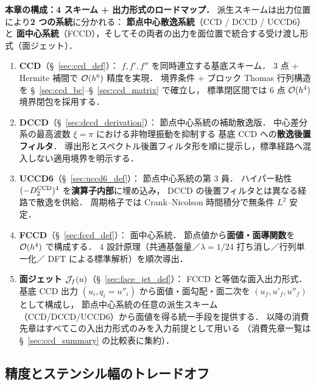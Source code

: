 \medskip
\noindent\textbf{本章の構成：4 スキーム + 出力形式のロードマップ．}
派生スキームは出力位置により\textbf{2 つの系統}に分かれる：
\textbf{節点中心散逸系統}（CCD / DCCD / UCCD6）と
\textbf{面中心系統}（FCCD），そしてその両者の出力を面位置で統合する受け渡し形式（面ジェット）．
\begin{enumerate}[leftmargin=*, label=(\arabic*), itemsep=2pt, topsep=2pt]
  \item \textbf{CCD}（§~\ref{sec:ccd_def}）：
        $f, f', f''$ を同時連立する基底スキーム．
        3 点 + Hermite 補間で $\mathcal{O}(h^6)$ 精度を実現．
        境界条件 + ブロック Thomas 行列構造を §~\ref{sec:ccd_bc}--§~\ref{sec:ccd_matrix} で確立し，
        標準閉区間では 6 点 $\mathcal{O}(h^4)$ 境界閉包を採用する．
  \item \textbf{DCCD}（§~\ref{sec:dccd_derivation}）：
        節点中心系統の補助散逸版．
        中心差分系の最高波数 $\xi=\pi$ における非物理振動を抑制する
        基底 CCD への\textbf{散逸後置フィルタ}．
        導出形とスペクトル後置フィルタ形を順に提示し，標準経路へ混入しない適用境界を明示する．
  \item \textbf{UCCD6}（§~\ref{sec:uccd6_def}）：
        節点中心系統の第 3 員．
        ハイパー粘性 $(-D_2^{\mathrm{CCD}})^4$ を\textbf{演算子内部}に埋め込み，
        DCCD の後置フィルタとは異なる経路で散逸を供給．
        周期格子では Crank--Nicolson 時間積分で無条件 $L^2$ 安定．
  \item \textbf{FCCD}（§~\ref{sec:fccd_def}）：
        面中心系統．
        節点値から\textbf{面値・面導関数}を $\mathcal{O}(h^4)$ で構成する．
        4 設計原理（共通基盤量／$\lambda=1/24$ 打ち消し／行列単一化／
        DFT による標準解析）を順次導出．
  \item \textbf{面ジェット $\mathcal{J}_{f}\!\left(u\right)$}（§~\ref{sec:face_jet_def}）：
        FCCD と等価な面入出力形式．
        基底 CCD 出力 $(u_i, q_i = u''_i)$ から面値・面勾配・面二次を $(u_f, u'_f, u''_f)$ として構成し，
        節点中心系統の任意の派生スキーム（CCD/DCCD/UCCD6）から面値を得る統一手段を提供する．
        以降の消費先章はすべてこの入出力形式のみを入力前提として用いる
        （消費先章一覧は §~\ref{sec:ccd_summary} の比較表に集約）．
\end{enumerate}

\subsection{精度とステンシル幅のトレードオフ}
\label{sec:ccd_motivation}

